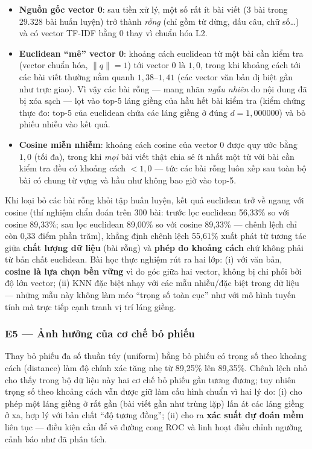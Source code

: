 \begin{itemize}
    \item \textbf{Nguồn gốc vector 0}: sau tiền xử lý, một số rất ít bài viết (3 bài trong 29.328 bài huấn luyện) trở thành \textit{rỗng} (chỉ gồm từ dừng, dấu câu, chữ số\ldots) và có vector TF-IDF bằng 0 thay vì chuẩn hóa L2.
    \item \textbf{Euclidean ``mê'' vector 0}: khoảng cách euclidean từ một bài cần kiểm tra (vector chuẩn hóa, $\lVert q \rVert = 1$) tới vector 0 là $1{,}0$, trong khi khoảng cách tới các bài viết thường nằm quanh $1{,}38$--$1{,}41$ (các vector văn bản dị biệt gần như trực giao). Vì vậy các bài rỗng --- mang nhãn \textit{ngẫu nhiên} do nội dung đã bị xóa sạch --- lọt vào top-5 láng giềng của hầu hết bài kiểm tra (kiểm chứng thực đo: top-5 của euclidean chứa các láng giềng ở đúng $d = 1{,}000000$) và bỏ phiếu nhiễu vào kết quả.
    \item \textbf{Cosine miễn nhiễm}: khoảng cách cosine của vector 0 được quy ước bằng $1{,}0$ (tối đa), trong khi \textit{mọi} bài viết thật chia sẻ ít nhất một từ với bài cần kiểm tra đều có khoảng cách $< 1{,}0$ --- tức các bài rỗng luôn xếp sau toàn bộ bài có chung từ vựng và hầu như không bao giờ vào top-5.
\end{itemize}

Khi loại bỏ các bài rỗng khỏi tập huấn luyện, kết quả euclidean trở về ngang với cosine (thí nghiệm chẩn đoán trên 300 bài: trước lọc euclidean 56,33\% so với cosine 89,33\%; sau lọc euclidean 89,00\% so với cosine 89,33\% --- chênh lệch chỉ còn 0,33 điểm phần trăm), khẳng định chênh lệch 55,61\% xuất phát từ tương tác giữa \textbf{chất lượng dữ liệu} (bài rỗng) và \textbf{phép đo khoảng cách} chứ không phải từ bản chất euclidean. Bài học thực nghiệm rút ra hai lớp: (i) với văn bản, \textbf{cosine là lựa chọn bền vững} vì đo góc giữa hai vector, không bị chi phối bởi độ lớn vector; (ii) KNN đặc biệt nhạy với các mẫu nhiễu/đặc biệt trong dữ liệu --- những mẫu này không làm méo ``trọng số toàn cục'' như với mô hình tuyến tính mà trực tiếp cạnh tranh vị trí láng giềng.

\subsubsection{E5 --- Ảnh hưởng của cơ chế bỏ phiếu}

Thay bỏ phiếu đa số thuần túy (uniform) bằng bỏ phiếu có trọng số theo khoảng cách (distance) làm độ chính xác tăng nhẹ từ 89,25\% lên 89,35\%. Chênh lệch nhỏ cho thấy trong bộ dữ liệu này hai cơ chế bỏ phiếu gần tương đương; tuy nhiên trọng số theo khoảng cách vẫn được giữ làm cấu hình chuẩn vì hai lý do: (i) cho phép một láng giềng ở rất gần (bài viết gần như trùng lặp) lấn át các láng giềng ở xa, hợp lý với bản chất ``độ tương đồng''; (ii) cho ra \textbf{xác suất dự đoán mềm} liên tục --- điều kiện cần để vẽ đường cong ROC và linh hoạt điều chỉnh ngưỡng cảnh báo như đã phân tích.

